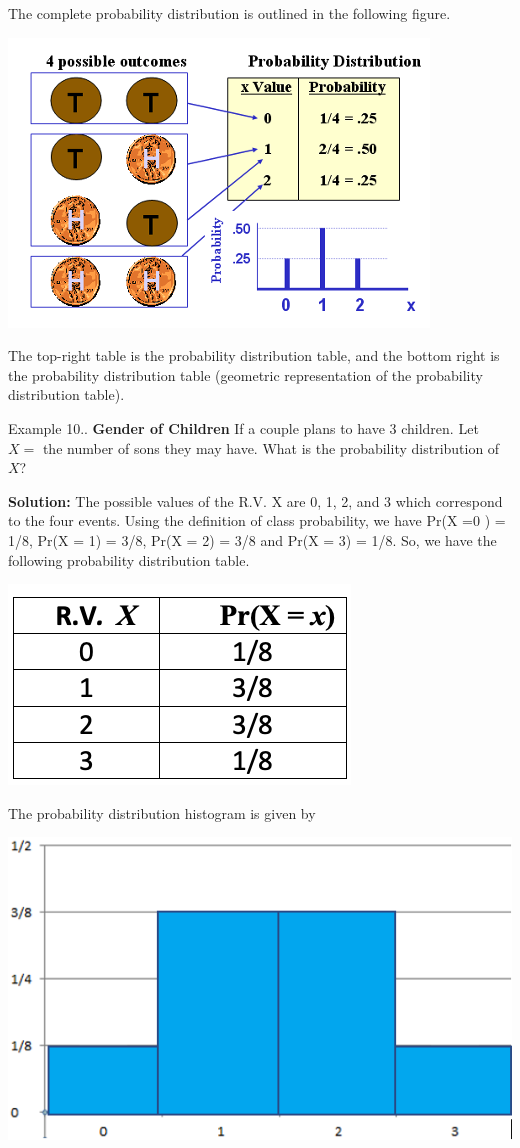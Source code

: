 \documentclass[
]{book}
\begin{document}
The complete probability distribution is outlined in the following figure.

\begin{center}\includegraphics[width=0.5\linewidth]{week03/coinTossingRV} \end{center}

The top-right table is the probability distribution table, and the bottom right is the probability distribution table (geometric representation of the probability distribution table).

Example 10.. \textbf{Gender of Children} If a couple plans to have 3 children. Let \(X =\) the number of sons they may have. What is the probability distribution of \(X\)?

\textbf{Solution:} The possible values of the R.V. X are 0, 1, 2, and 3 which correspond to the four events. Using the definition of class probability, we have Pr(X =0 ) = 1/8, Pr(X = 1) = 3/8, Pr(X = 2) = 3/8 and Pr(X = 3) = 1/8. So, we have the following probability distribution table.

\begin{center}\includegraphics[width=0.3\linewidth]{week03/probDist3Kid} \end{center}

The probability distribution histogram is given by

\begin{center}\includegraphics[width=0.4\linewidth]{week03/probHist3Kid} \end{center}
\end{document}

